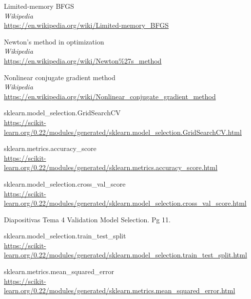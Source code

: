 \begin{thebibliography}{9}
Limited-memory BFGS
\\\textit{Wikipedia}
\\\url{https://en.wikipedia.org/wiki/Limited-memory\_BFGS}

Newton's method in optimization
\\\textit{Wikipedia}
\\\url{https://en.wikipedia.org/wiki/Newton\%27s\_method}

Nonlinear conjugate gradient method
\\\textit{Wikipedia}
\\\url{https://en.wikipedia.org/wiki/Nonlinear\_conjugate\_gradient\_method}

sklearn.model\_selection.GridSearchCV
\\\url{https://scikit-learn.org/0.22/modules/generated/sklearn.model\_selection.GridSearchCV.html}

sklearn.metrics.accuracy\_score
\\\url{https://scikit-learn.org/0.22/modules/generated/sklearn.metrics.accuracy\_score.html}

sklearn.model\_selection.cross\_val\_score
\\\url{https://scikit-learn.org/0.22/modules/generated/sklearn.model\_selection.cross\_val\_score.html}

Diapositivas Tema 4 Validation Model Selection. Pg 11.

sklearn.model\_selection.train\_test\_split
\\\url{https://scikit-learn.org/0.22/modules/generated/sklearn.model\_selection.train\_test\_split.html}

sklearn.metrics.mean\_squared\_error
\\\url{https://scikit-learn.org/0.22/modules/generated/sklearn.metrics.mean\_squared\_error.html}



\end{thebibliography}
